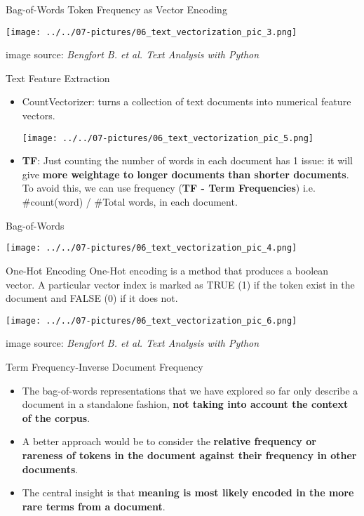 \documentclass[11pt]{beamer}
\begin{document}
\begin{frame}{Bag-of-Words}
	Token Frequency as Vector Encoding
	\begin{center}
	\texttt{[image: ../../07-pictures/06\_text\_vectorization\_pic\_3.png]}
	\end{center}
	\footnotesize{image source: \textit{Bengfort B. et al. Text Analysis with Python}}
\end{frame}
\begin{frame}{Text Feature Extraction}
	\begin{itemize}
		\item CountVectorizer: turns a collection of text documents into numerical feature vectors.
	\begin{center}
	\texttt{[image: ../../07-pictures/06\_text\_vectorization\_pic\_5.png]}
	\end{center}
		\item \textbf{TF}: Just counting the number of words in each document has 1 issue: it will give \textbf{more weightage to longer documents than shorter documents}. To avoid this, we can use frequency (\textbf{TF - Term Frequencies}) i.e. \#count(word) / \#Total words, in each document.
	\end{itemize}
\end{frame}
\begin{frame}{Bag-of-Words  }
	\begin{center}
	\texttt{[image: ../../07-pictures/06\_text\_vectorization\_pic\_4.png]}
	\end{center}
\end{frame}
\begin{frame}{One-Hot Encoding}
	One-Hot encoding is a method that produces a boolean vector. A particular vector index is marked as TRUE (1) if the token exist in the document and FALSE (0) if it does not.
	\begin{center}
	\texttt{[image: ../../07-pictures/06\_text\_vectorization\_pic\_6.png]}
	\end{center}
	\footnotesize{image source: \textit{Bengfort B. et al. Text Analysis with Python}}
\end{frame}
\begin{frame}{Term Frequency-Inverse Document Frequency }
	\begin{itemize}
		\item The bag-of-words representations that we have explored so far only describe a document in a standalone fashion, \textbf{not taking into account the context of the corpus}. 
		\item A better approach would be to consider the \textbf{relative frequency or rareness of tokens in the document against their frequency in other documents}. 
		\item The central insight is that \textbf{meaning is most likely encoded in the more rare terms from a document}.
	\end{itemize}
\end{frame}
\end{document}
